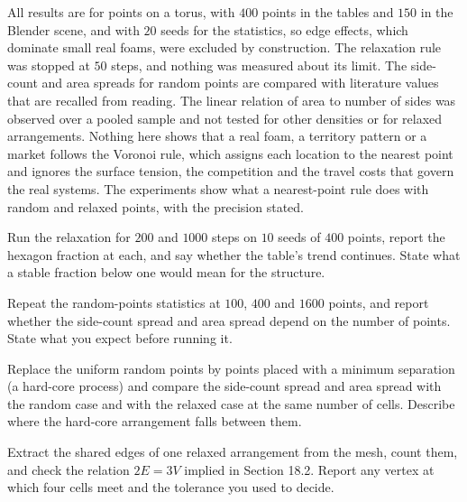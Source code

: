 All results are for points on a torus, with $400$ points in the tables and $150$ in the Blender scene, and with $20$ seeds for the statistics, so edge effects, which dominate small real foams, were excluded by construction. The relaxation rule was stopped at $50$ steps, and nothing was measured about its limit. The side-count and area spreads for random points are compared with literature values that are recalled from reading. The linear relation of area to number of sides was observed over a pooled sample and not tested for other densities or for relaxed arrangements. Nothing here shows that a real foam, a territory pattern or a market follows the Voronoi rule, which assigns each location to the nearest point and ignores the surface tension, the competition and the travel costs that govern the real systems. The experiments show what a nearest-point rule does with random and relaxed points, with the precision stated.

\begin{exercise}
Run the relaxation for $200$ and $1000$ steps on $10$ seeds of $400$ points, report the hexagon fraction at each, and say whether the table's trend continues. State what a stable fraction below one would mean for the structure.
\end{exercise}

\begin{exercise}[18.2: Density]
Repeat the random-points statistics at $100$, $400$ and $1600$ points, and report whether the side-count spread and area spread depend on the number of points. State what you expect before running it.
\end{exercise}

\begin{exercise}
Replace the uniform random points by points placed with a minimum separation (a hard-core process) and compare the side-count spread and area spread with the random case and with the relaxed case at the same number of cells. Describe where the hard-core arrangement falls between them.
\end{exercise}

\begin{exercise}
Extract the shared edges of one relaxed arrangement from the mesh, count them, and check the relation $2E=3V$ implied in Section 18.2. Report any vertex at which four cells meet and the tolerance you used to decide.
\end{exercise}
